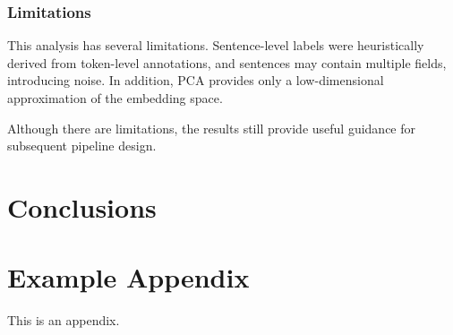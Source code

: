 \documentclass[11pt]{article}
\begin{document}
\subsubsection{Limitations}

This analysis has several limitations. Sentence-level labels were heuristically derived from token-level annotations, and sentences may contain multiple fields, introducing noise. In addition, PCA provides only a low-dimensional approximation of the embedding space.

Although there are limitations, the results still provide useful guidance for subsequent pipeline design.

\section{Conclusions}









%


\appendix

\section{Example Appendix}
\label{sec:appendix}

This is an appendix.
\end{document}
